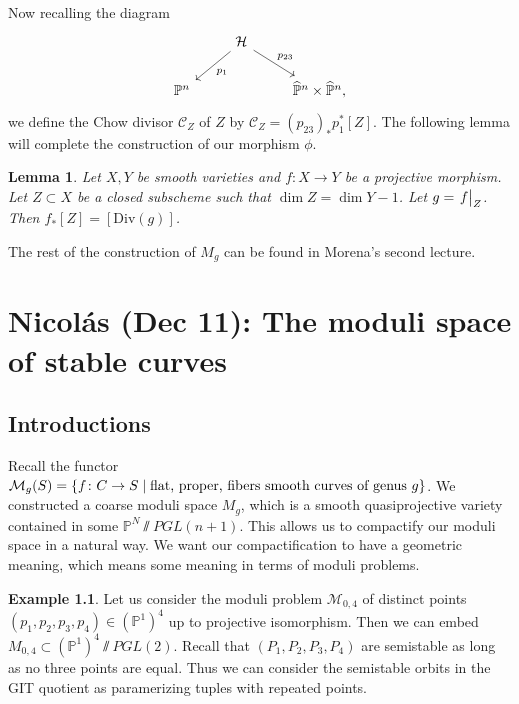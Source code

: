 \documentclass[leqno, openany]{memoir}
\newtheorem{lem}[thm]{Lemma}
\theoremstyle{definition}
\newtheorem{exm}[thm]{Example}
\theoremstyle{remark}
\theoremstyle{plain}
\theoremstyle{definition}
\theoremstyle{remark}
\renewcommand{\P}{\mathbb{P}}
\newcommand{\mc}[1]{\mathcal{#1}}
\newcommand{\mr}[1]{\mathrm{#1}}
\newcommand{\wh}[1]{\widehat{#1}}
\begin{document}
Now recalling the diagram \begin{equation*} \begin{tikzcd} & \mc{H}
\arrow{dl}{p_1} \arrow{dr}{p_{23}} \\ \P^n & & \wh{\P}^n \times \wh{\P}^n,
\end{tikzcd} \end{equation*} we define the Chow divisor $\mc{C}_Z$ of $Z$ by
$\mc{C}_Z = {(p_{23})}_* p_1^* [Z]$. The following lemma will complete the
construction of our morphism $\phi$.

\begin{lem} Let $X, Y$ be smooth varieties and $f \colon X \to Y$ be a
projective morphism. Let $Z \subset X$ be a closed subscheme such that $\dim Z
= \dim Y - 1$. Let $g = \eval{f}_Z$. Then $f_* [Z] = [\mr{Div}(g)]$.  \end{lem}

The rest of the construction of $M_g$ can be found in Morena's second lecture.

\chapter{Nicol\'as (Dec 11): The moduli space of stable curves}%
\label{cha:nicol'as_dec_11_the_moduli_space_of_stable_curves}

\section{Introductions}%

Recall the functor $\mc{M}_g(S) = \qty{f \colon C \to S \mid \text{flat,
proper, fibers smooth curves of genus $g$}}$. We constructed a coarse moduli
space $M_g$, which is a smooth quasiprojective variety contained in some $\P^N
\sslash PGL(n+1)$. This allows us to compactify our moduli space in a natural
way. We want our compactification to have a geometric meaning, which means some
meaning in terms of moduli problems.

\begin{exm} Let us consider the moduli problem $\mc{M}_{0,4}$ of distinct
    points $(p_1, p_2, p_3, p_4) \in { ( \P^1 ) }^4$ up to projective
    isomorphism. Then we can embed $M_{0,4} \subset {(\P^1)}^4 \sslash PGL(2)$.
    Recall that $(P_1, P_2, P_3, P_4)$ are semistable as long as no three
    points are equal. Thus we can consider the semistable orbits in the GIT
    quotient as paramerizing tuples with repeated points.  \end{exm}
\end{document}
